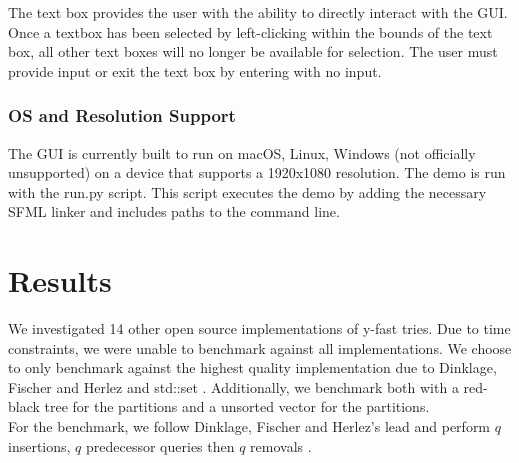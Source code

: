 \documentclass{article}
\begin{document}
\noindent
The text box provides the user with the ability to directly interact with the GUI. Once a textbox has been selected by left-clicking within the bounds of the text box, all other text boxes will no longer be available for selection. The user must provide input or exit the text box by entering with no input.
\\

\subsubsection{OS and Resolution Support}
The GUI is currently built to run on macOS, Linux, Windows (not officially unsupported) on a device that supports a 1920x1080 resolution.
The demo is run with the run.py script. This script executes the demo by adding the necessary SFML linker and includes paths to the command line.


\section{Results}
\noindent
We investigated 14 other open source implementations of y-fast tries. Due to time constraints, we were unable to benchmark against all implementations. We choose to only benchmark against the highest quality implementation due to Dinklage, Fischer and Herlez and std::set \cite{DBLP:journals/corr/abs-2104-06740}. Additionally, we benchmark both with a red-black tree for the partitions and a unsorted vector for the partitions. 
\\

\noindent
For the benchmark, we follow Dinklage, Fischer and Herlez's lead and perform $q$ insertions, $q$ predecessor queries then $q$ removals \cite{DBLP:journals/corr/abs-2104-06740}. 

\end{document}
